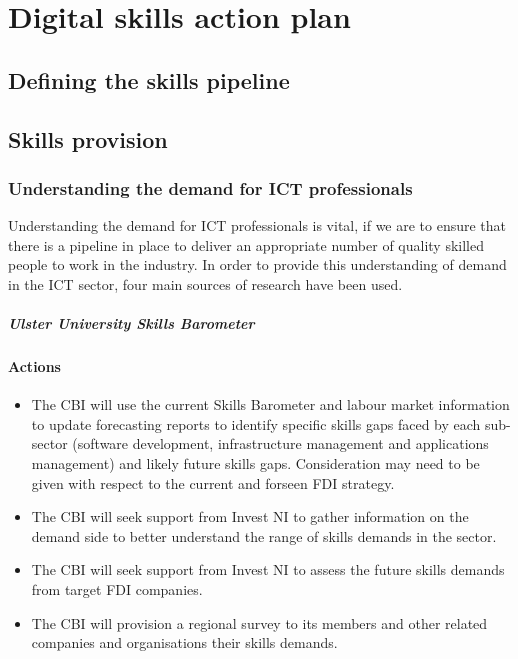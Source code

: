 \chapter{Digital skills action plan}

\section{Defining the skills pipeline}

\section{Skills provision}
\label{sec:skillsProvision}

\subsection{Understanding the demand for ICT professionals}

Understanding the demand for ICT professionals is vital, if we are to ensure that there is a
pipeline in place to deliver an appropriate number of quality skilled people to work in the
industry. In order to provide this understanding of demand in the ICT sector, four main
sources of research have been used.

\paragraph{Ulster University Skills Barometer}



\subsubsection{Actions}

\begin{itemize}
    \item The CBI will use the current Skills Barometer and labour market information to update forecasting reports to identify specific skills gaps faced by each sub-sector (software development, infrastructure management and applications management) and likely future skills gaps. Consideration may need to be given with respect to the current and forseen FDI strategy.
    \item The CBI will seek support from Invest NI to gather information on the demand side to better understand the range of skills demands in the sector.
    \item The CBI will seek support from Invest NI to assess the future skills demands from target FDI companies.
    \item The CBI will provision a regional survey to its members and other related companies and organisations their skills demands.
\end{itemize}


